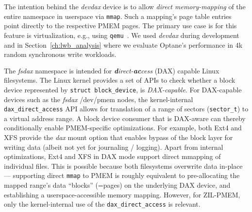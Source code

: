 \documentclass[12pt,a4paper,twoside]{book}
\begin{document}
The intention behind the \textit{devdax} device is to allow \textit{direct memory-mapping} of the entire namespace in userspace via \lstinline{mmap}.
Such a mapping's page table entries point directly to the respective PMEM pages.
The primary use case is for this feature is virtualization, e.g., using \lstinline{qemu}~\cite{PmemIoUsingQemuVirtualization}.
We used \textit{devdax} during development and in Section~\ref{ch:lwb_analysis} where we evaluate Optane's performance in 4k random synchronous write workloads.

The \textit{fsdax} namespace is intended for \textit{\textbf{d}irect-\textbf{ac}cess} (DAX) capable Linux filesystems.
The Linux kernel provides a set of APIs to check whether a block device represented by \lstinline[style=figurepseudocode]{struct block_device}, is \textit{DAX-capable}.
For DAX-capable devices such as the \textit{fsdax} /dev/pmem nodes, the kernel-internal \lstinline{dax_direct_access} API allows for translation of a range of sectors (\lstinline{sector_t}) to a virtual address range.
A block device consumer that is DAX-aware can thereby conditionally enable PMEM-specific optimizations.
For example, both Ext4 and XFS provide the \textit{dax} mount option that enables bypass of the block layer for writing data (albeit not yet for journaling / logging).
Apart from internal optimizations, Ext4 and XFS in DAX mode support direct mmapping of individual files.
This is possible because both filesystems overwrite data in-place --- supporting direct \lstinline{mmap} to PMEM is roughly equivalent to pre-allocating the mapped range's data ``blocks'' (=pages) on the underlying DAX device, and establishing a userspace-accessible memory mapping.
However, for ZIL-PMEM, only the kernel-internal use of the \lstinline{dax_direct_access} is relevant.

\end{document}
